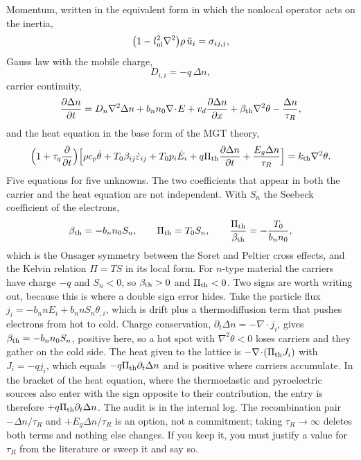 \documentclass[11pt]{article}
\begin{document}
Momentum, written in the equivalent form in which the nonlocal operator acts on the inertia,
\begin{equation}
\bigl(1-l_{\rm nl}^2\nabla^2\bigr)\rho\,\ddot u_i=\sigma_{ij,j},
\end{equation}
Gauss law with the mobile charge,
\begin{equation}
D_{i,i}=-q\,\Delta n ,
\end{equation}
carrier continuity,
\begin{equation}
\frac{\partial\Delta n}{\partial t}
=D_n\nabla^2\Delta n+b_nn_0\nabla\!\cdot\!E+v_d\frac{\partial\Delta n}{\partial x}
+\beta_{\rm th}\nabla^2\theta-\frac{\Delta n}{\tau_R},
\end{equation}
and the heat equation in the base form of the MGT theory,
\begin{equation}
\Bigl(1+\tau_q\frac{\partial}{\partial t}\Bigr)
\Bigl[\rho c_p\dot\theta+T_0\beta_{ij}\dot\varepsilon_{ij}+T_0p_i\dot E_i
+q\Pi_{\rm th}\frac{\partial\Delta n}{\partial t}+\frac{E_g\Delta n}{\tau_R}\Bigr]
=k_{\rm th}\nabla^2\theta .
\end{equation}
Five equations for five unknowns. The two coefficients that appear in both the carrier and the heat
equation are not independent. With $S_n$ the Seebeck coefficient of the electrons,
\begin{equation}
\beta_{\rm th}=-b_nn_0S_n,\qquad \Pi_{\rm th}=T_0S_n,\qquad
\frac{\Pi_{\rm th}}{\beta_{\rm th}}=-\frac{T_0}{b_nn_0},
\end{equation}
which is the Onsager symmetry between the Soret and Peltier cross effects, and the Kelvin relation
$\Pi=TS$ in its local form. For $n$-type material the carriers have charge $-q$ and $S_n<0$, so
$\beta_{\rm th}>0$ and $\Pi_{\rm th}<0$. Two signs are worth writing out, because this is where a double
sign error hides. Take the particle flux $j_i=-b_nnE_i+b_nnS_n\theta_{,i}$, which is drift plus a
thermodiffusion term that pushes electrons from hot to cold. Charge conservation,
$\partial_t\Delta n=-\nabla\!\cdot\!j_i$, gives $\beta_{\rm th}=-b_nn_0S_n$, positive here, so a hot spot
with $\nabla^2\theta<0$ loses carriers and they gather on the cold side. The heat given to the lattice is
$-\nabla\!\cdot\!(\Pi_{\rm th}J_i)$ with $J_i=-qj_i$, which equals $-q\Pi_{\rm th}\partial_t\Delta n$ and is
positive where carriers accumulate. In the bracket of the heat equation, where the thermoelastic and
pyroelectric sources also enter with the sign opposite to their contribution, the entry is therefore
$+q\Pi_{\rm th}\partial_t\Delta n$. The audit is in the internal log. The recombination pair $-\Delta n/\tau_R$ and
$+E_g\Delta n/\tau_R$ is an option, not a commitment; taking $\tau_R\to\infty$ deletes both terms and
nothing else changes. If you keep it, you must justify a value for $\tau_R$ from the literature or sweep it
and say so.
\end{document}
